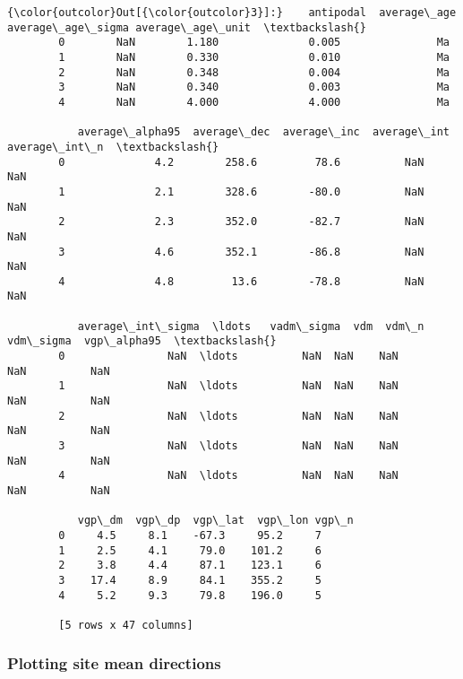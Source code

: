 \documentclass{article}
\begin{document}
            \begin{Verbatim}[commandchars=\\\{\}]
{\color{outcolor}Out[{\color{outcolor}3}]:}    antipodal  average\_age  average\_age\_sigma average\_age\_unit  \textbackslash{}
        0        NaN        1.180              0.005               Ma   
        1        NaN        0.330              0.010               Ma   
        2        NaN        0.348              0.004               Ma   
        3        NaN        0.340              0.003               Ma   
        4        NaN        4.000              4.000               Ma   
        
           average\_alpha95  average\_dec  average\_inc  average\_int  average\_int\_n  \textbackslash{}
        0              4.2        258.6         78.6          NaN            NaN   
        1              2.1        328.6        -80.0          NaN            NaN   
        2              2.3        352.0        -82.7          NaN            NaN   
        3              4.6        352.1        -86.8          NaN            NaN   
        4              4.8         13.6        -78.8          NaN            NaN   
        
           average\_int\_sigma  \ldots   vadm\_sigma  vdm  vdm\_n  vdm\_sigma  vgp\_alpha95  \textbackslash{}
        0                NaN  \ldots          NaN  NaN    NaN        NaN          NaN   
        1                NaN  \ldots          NaN  NaN    NaN        NaN          NaN   
        2                NaN  \ldots          NaN  NaN    NaN        NaN          NaN   
        3                NaN  \ldots          NaN  NaN    NaN        NaN          NaN   
        4                NaN  \ldots          NaN  NaN    NaN        NaN          NaN   
        
           vgp\_dm  vgp\_dp  vgp\_lat  vgp\_lon vgp\_n  
        0     4.5     8.1    -67.3     95.2     7  
        1     2.5     4.1     79.0    101.2     6  
        2     3.8     4.4     87.1    123.1     6  
        3    17.4     8.9     84.1    355.2     5  
        4     5.2     9.3     79.8    196.0     5  
        
        [5 rows x 47 columns]
\end{Verbatim}
        

    \subsubsection{Plotting site mean directions}
\end{document}
